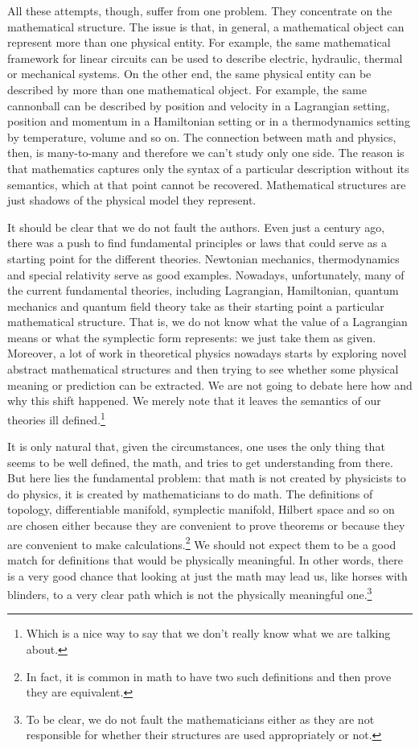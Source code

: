 \documentclass[11pt]{article}
\begin{document}
All these attempts, though, suffer from one problem. They concentrate on the mathematical structure. The issue is that, in general, a mathematical object can represent more than one physical entity. For example, the same mathematical framework for linear circuits can be used to describe electric, hydraulic, thermal or mechanical systems. On the other end, the same physical entity can be described by more than one mathematical object. For example, the same cannonball can be described by position and velocity in a Lagrangian setting, position and momentum in a Hamiltonian setting or in a thermodynamics setting by temperature, volume and so on. The connection between math and physics, then, is many-to-many and therefore we can't study only one side. The reason is that mathematics captures only the syntax of a particular description without its semantics, which at that point cannot be recovered. Mathematical structures are just shadows of the physical model they represent.

It should be clear that we do not fault the authors. Even just a century ago, there was a push to find fundamental principles or laws that could serve as a starting point for the different theories. Newtonian mechanics, thermodynamics and special relativity serve as good examples. Nowadays, unfortunately, many of the current fundamental theories, including Lagrangian, Hamiltonian, quantum mechanics and quantum field theory take as their starting point a particular mathematical structure. That is, we do not know what the value of a Lagrangian means or what the symplectic form represents: we just take them as given. Moreover, a lot of work in theoretical physics nowadays starts by exploring novel abstract mathematical structures and then trying to see whether some physical meaning or prediction can be extracted. We are not going to debate here how and why this shift happened. We merely note that it leaves the semantics of our theories ill defined.\footnote{Which is a nice way to say that we don't really know what we are talking about.} 

It is only natural that, given the circumstances, one uses the only thing that seems to be well defined, the math, and tries to get understanding from there. But here lies the fundamental problem: that math is not created by physicists to do physics, it is created by mathematicians to do math. The definitions of topology, differentiable manifold, symplectic manifold, Hilbert space and so on are chosen either because they are convenient to prove theorems or because they are convenient to make calculations.\footnote{In fact, it is common in math to have two such definitions and then prove they are equivalent.} We should not expect them to be a good match for definitions that would be physically meaningful. In other words, there is a very good chance that looking at just the math may lead us, like horses with blinders, to a very clear path which is not the physically meaningful one.\footnote{To be clear, we do not fault the mathematicians either as they are not responsible for whether their structures are used appropriately or not.}
\end{document}
